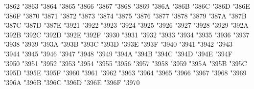 {\Uchar\jis"3862 %
\Uchar\jis"3863 %
\Uchar\jis"3864 %
\Uchar\jis"3865 %
\Uchar\jis"3866 %
\Uchar\jis"3867 %
\Uchar\jis"3868 %
\Uchar\jis"3869 %
\Uchar\jis"386A %
\Uchar\jis"386B %
\Uchar\jis"386C %
\Uchar\jis"386D %
\Uchar\jis"386E %
\Uchar\jis"386F %
\Uchar\jis"3870 %
\Uchar\jis"3871 %
\Uchar\jis"3872 %
\Uchar\jis"3873 %
\Uchar\jis"3874 %
\Uchar\jis"3875 %
\Uchar\jis"3876 %
\Uchar\jis"3877 %
\Uchar\jis"3878 %
\Uchar\jis"3879 %
\Uchar\jis"387A %
\Uchar\jis"387B %
\Uchar\jis"387C %
\Uchar\jis"387D %
\Uchar\jis"387E %
\Uchar\jis"3921 %
\Uchar\jis"3922 %
\Uchar\jis"3923 %
\Uchar\jis"3924 %
\Uchar\jis"3925 %
\Uchar\jis"3926 %
\Uchar\jis"3927 %
\Uchar\jis"3928 %
\Uchar\jis"3929 %
\Uchar\jis"392A %
\Uchar\jis"392B %
\Uchar\jis"392C %
\Uchar\jis"392D %
\Uchar\jis"392E %
\Uchar\jis"392F %
\Uchar\jis"3930 %
\Uchar\jis"3931 %
\Uchar\jis"3932 %
\Uchar\jis"3933 %
\Uchar\jis"3934 %
\Uchar\jis"3935 %
\Uchar\jis"3936 %
\Uchar\jis"3937 %
\Uchar\jis"3938 %
\Uchar\jis"3939 %
\Uchar\jis"393A %
\Uchar\jis"393B %
\Uchar\jis"393C %
\Uchar\jis"393D %
\Uchar\jis"393E %
\Uchar\jis"393F %
\Uchar\jis"3940 %
\Uchar\jis"3941 %
\Uchar\jis"3942 %
\Uchar\jis"3943 %
\Uchar\jis"3944 %
\Uchar\jis"3945 %
\Uchar\jis"3946 %
\Uchar\jis"3947 %
\Uchar\jis"3948 %
\Uchar\jis"3949 %
\Uchar\jis"394A %
\Uchar\jis"394B %
\Uchar\jis"394C %
\Uchar\jis"394D %
\Uchar\jis"394E %
\Uchar\jis"394F %
\Uchar\jis"3950 %
\Uchar\jis"3951 %
\Uchar\jis"3952 %
\Uchar\jis"3953 %
\Uchar\jis"3954 %
\Uchar\jis"3955 %
\Uchar\jis"3956 %
\Uchar\jis"3957 %
\Uchar\jis"3958 %
\Uchar\jis"3959 %
\Uchar\jis"395A %
\Uchar\jis"395B %
\Uchar\jis"395C %
\Uchar\jis"395D %
\Uchar\jis"395E %
\Uchar\jis"395F %
\Uchar\jis"3960 %
\Uchar\jis"3961 %
\Uchar\jis"3962 %
\Uchar\jis"3963 %
\Uchar\jis"3964 %
\Uchar\jis"3965 %
\Uchar\jis"3966 %
\Uchar\jis"3967 %
\Uchar\jis"3968 %
\Uchar\jis"3969 %
\Uchar\jis"396A %
\Uchar\jis"396B %
\Uchar\jis"396C %
\Uchar\jis"396D %
\Uchar\jis"396E %
\Uchar\jis"396F %
\Uchar\jis"3970 %
}
